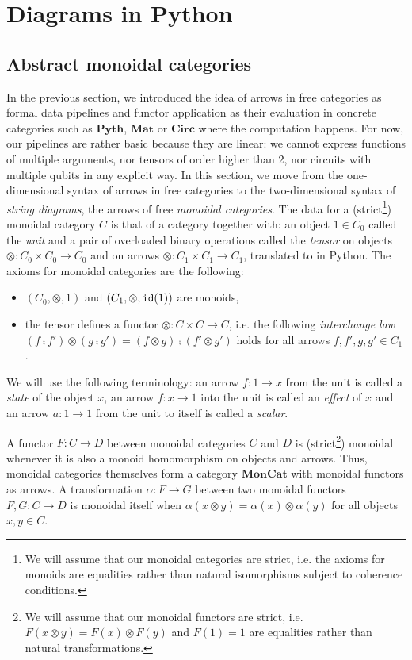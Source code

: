 
\section{Diagrams in Python} \label{section:monoidal}

\subsection{Abstract monoidal categories}

In the previous section, we introduced the idea of arrows in free categories as formal data pipelines and functor application as their evaluation in concrete categories such as $\mathbf{Pyth}$, $\mathbf{Mat}$ or $\mathbf{Circ}$ where the computation happens.
For now, our pipelines are rather basic because they are linear: we cannot express functions of multiple arguments, nor tensors of order higher than 2, nor circuits with multiple qubits in any explicit way.
In this section, we move from the one-dimensional syntax of arrows in free categories to the two-dimensional syntax of \emph{string diagrams}, the arrows of free \emph{monoidal categories}.
The data for a (strict\footnote
{We will assume that our monoidal categories are strict, i.e. the axioms for monoids are equalities rather than natural isomorphisms subject to coherence conditions.}) monoidal category $C$ is that of a category together with:
an object $1 \in C_0$ called the \emph{unit} and a pair of overloaded binary operations called the \emph{tensor} on objects $\otimes : C_0 \times C_0 \to C_0$ and on arrows $\otimes : C_1 \times C_1 \to C_1$, translated to  in Python.
The axioms for monoidal categories are the following:
\begin{itemize}
\item $(C_0, \otimes, 1)$ and $(C_1, \otimes, \mathtt{id}(1))$ are monoids,
\item the tensor defines a functor $\otimes : C \times C \to C$, i.e. the following \emph{interchange law} $(f \fcmp f') \otimes (g \fcmp g') = (f \otimes g) \fcmp (f' \otimes g')$ holds for all arrows $f, f', g, g' \in C_1$.
\end{itemize}
We will use the following terminology: an arrow $f : 1 \to x$ from the unit is called a \emph{state} of the object $x$, an arrow $f : x \to 1$ into the unit is called an \emph{effect} of $x$ and an arrow $a : 1 \to 1$ from the unit to itself is called a \emph{scalar}.

A functor $F : C \to D$ between monoidal categories $C$ and $D$ is (strict\footnote
{We will assume that our monoidal functors are strict, i.e. $F(x \otimes y) = F(x) \otimes F(y)$ and $F(1) = 1$ are equalities rather than natural transformations.}) monoidal whenever it is also a monoid homomorphism on objects and arrows.
Thus, monoidal categories themselves form a category $\mathbf{MonCat}$ with monoidal functors as arrows.
A transformation $\alpha : F \to G$ between two monoidal functors $F, G : C \to D$ is monoidal itself when $\alpha(x \otimes y) = \alpha(x) \otimes \alpha(y)$ for all objects $x, y \in C$.

